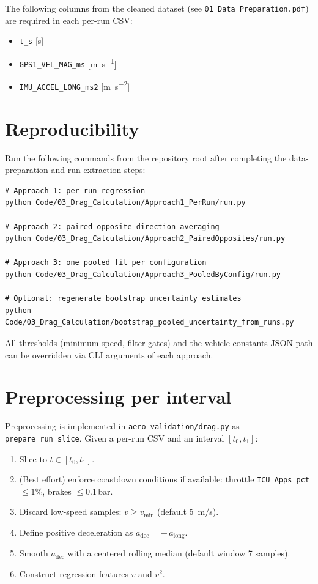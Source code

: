 \documentclass[11pt,a4paper]{article}
\begin{document}
The following columns from the cleaned dataset (see \texttt{01\_Data\_Preparation.pdf}) are required in each per-run CSV:
\begin{itemize}
  \item \texttt{t\_s} [s]
  \item \texttt{GPS1\_VEL\_MAG\_ms} [\si{\meter\per\second}]
  \item \texttt{IMU\_ACCEL\_LONG\_ms2} [\si{\meter\per\second\squared}]
\end{itemize}

\section{Reproducibility}
Run the following commands from the repository root after completing the
data-preparation and run-extraction steps:

\begin{verbatim}
# Approach 1: per-run regression
python Code/03_Drag_Calculation/Approach1_PerRun/run.py

# Approach 2: paired opposite-direction averaging
python Code/03_Drag_Calculation/Approach2_PairedOpposites/run.py

# Approach 3: one pooled fit per configuration
python Code/03_Drag_Calculation/Approach3_PooledByConfig/run.py

# Optional: regenerate bootstrap uncertainty estimates
python Code/03_Drag_Calculation/bootstrap_pooled_uncertainty_from_runs.py
\end{verbatim}

All thresholds (minimum speed, filter gates) and the vehicle constants JSON
path can be overridden via CLI arguments of each approach.

\section{Preprocessing per interval}
Preprocessing is implemented in \texttt{aero\_validation/drag.py} as
\texttt{prepare\_run\_slice}.  Given a per-run CSV and an interval $[t_0,t_1]$:
\begin{enumerate}
  \item Slice to \(t\in[t_0,t_1]\).
  \item (Best effort) enforce coastdown conditions if available:
    throttle \texttt{ICU\_Apps\_pct} $\le 1\%$, brakes $\le 0.1$\,bar.
  \item Discard low-speed samples: \(v \ge v_\mathrm{min}\) (default \SI{5}{m/s}).
  \item Define positive deceleration as \(a_\mathrm{dec} = -\,a_\mathrm{long}\).
  \item Smooth \(a_\mathrm{dec}\) with a centered rolling median (default window 7 samples).
  \item Construct regression features \(v\) and \(v^2\).
\end{enumerate}
\end{document}
